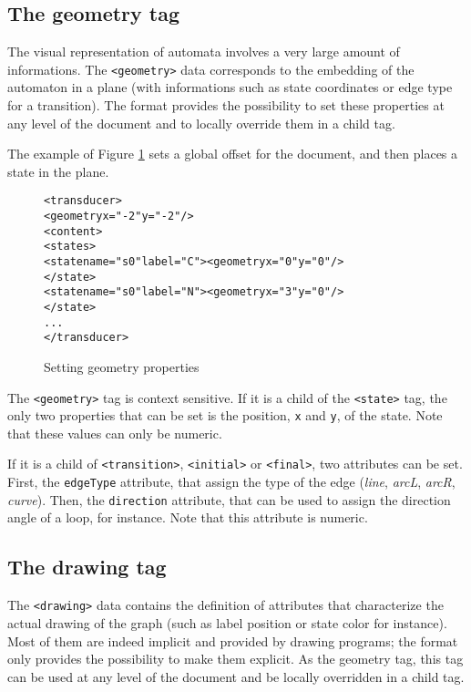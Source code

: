 \documentclass[a4paper]{article}
\begin{document}
\subsection{The geometry tag}

The visual representation of automata involves a very large amount of
informations.  The \verb|<geometry>| data corresponds to the embedding
of the automaton in a plane (with informations such as state
coordinates or edge type for a transition). The
format provides the possibility to set these properties at any level of the
document and to locally override them in a child tag.

The example of Figure \ref{geom1} sets a global offset
for the document, and then places a state in the plane.
{\small

\begin{figure}[h]
  \begin{center}
\begin{alltt}
<transducer>
  <geometry x="-2" y="-2"/> 
  <content>
     <states>
        <state name="s0" label="C"><geometry x="0" y="0"/>
        </state>
        <state name="s0" label="N"><geometry x="3" y="0"/>
        </state>
      ...
</transducer>
\end{alltt}

\caption{Setting geometry properties}
\label{geom1}
  \end{center}
\end{figure}

}

The \verb|<geometry>| tag is context sensitive. If it is a child of
the \verb|<state>| tag, the only two properties that can be set is the
position, \verb|x| and \verb|y|, of the state. Note that these values
can only be numeric.

If it is a child of \verb|<transition>|, \verb|<initial>| or
\verb|<final>|, two attributes can be set. First, the \verb|edgeType|
attribute, that assign the type of the edge (\textit{line},
\textit{arcL}, \textit{arcR}, \textit{curve}). Then, the
\verb|direction| attribute, that can be used to assign the direction
angle of a loop, for instance. Note that this attribute is numeric.


\subsection{The drawing tag}
The \verb|<drawing>| data
contains the definition of attributes that characterize the actual
drawing of the graph (such as label position or state color for
instance).
\\Most of them are indeed implicit and provided by drawing programs; the
format only provides the possibility to make them explicit.
As the geometry tag, this tag can be used at any level of the
document and be locally overridden in a child tag.
\end{document}
